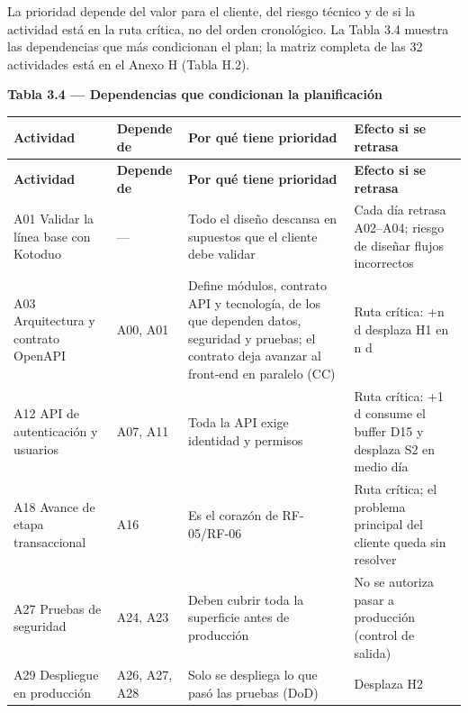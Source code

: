 \documentclass[11pt,a4paper]{article}
\begin{document}
La prioridad depende del valor para el cliente, del riesgo técnico y de si la actividad está en la ruta crítica, no del orden cronológico. La Tabla 3.4 muestra las dependencias que más condicionan el plan; la matriz completa de las 32 actividades está en el Anexo H (Tabla H.2).

\textbf{Tabla 3.4 --- Dependencias que condicionan la planificación}\nopagebreak

\begingroup\small
\begin{longtable}{@{}>{\raggedright\arraybackslash\hspace{0pt}}p{}>{\raggedright\arraybackslash\hspace{0pt}}p{}>{\raggedright\arraybackslash\hspace{0pt}}p{}>{\raggedright\arraybackslash\hspace{0pt}}p{}@{}}
\toprule
\textbf{Actividad} & \textbf{Depende de} & \textbf{Por qué tiene prioridad} & \textbf{Efecto si se retrasa} \\ \midrule
\endfirsthead
\toprule
\textbf{Actividad} & \textbf{Depende de} & \textbf{Por qué tiene prioridad} & \textbf{Efecto si se retrasa} \\ \midrule
\endhead
\bottomrule
\endlastfoot
A01 Validar la línea base con Kotoduo & \mbox{---} & Todo el diseño descansa en supuestos que el cliente debe validar & Cada día retrasa A02--A04; riesgo de diseñar flujos incorrectos \\ \addlinespace[0.25em]
A03 Arquitectura y contrato OpenAPI & A00, A01 & Define módulos, contrato API y tecnología, de los que dependen datos, seguridad y pruebas; el contrato deja avanzar al front-end en paralelo (CC) & Ruta crítica: +n d desplaza H1 en n d \\ \addlinespace[0.25em]
A12 API de autenticación y usuarios & A07, A11 & Toda la API exige identidad y permisos & Ruta crítica: +1 d consume el buffer D15 y desplaza S2 en medio día \\ \addlinespace[0.25em]
A18 Avance de etapa transaccional & \mbox{A16} & Es el corazón de \mbox{RF-05}/\mbox{RF-06} & Ruta crítica; el problema principal del cliente queda sin resolver \\ \addlinespace[0.25em]
A27 Pruebas de seguridad & A24, A23 & Deben cubrir toda la superficie antes de producción & No se autoriza pasar a producción (control de salida) \\ \addlinespace[0.25em]
A29 Despliegue en producción & A26, A27, A28 & Solo se despliega lo que pasó las pruebas (DoD) & Desplaza H2 \\
\end{longtable}
\endgroup
\end{document}
